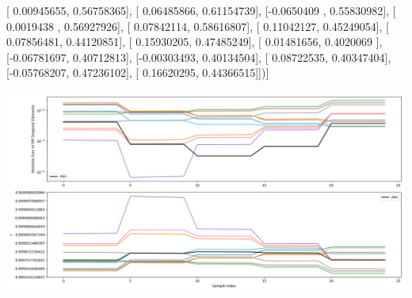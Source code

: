 \documentclass{article}
\begin{document}
       [ 0.00945655,  0.56758365],
       [ 0.06485866,  0.61154739],
       [-0.0650409 ,  0.55830982],
       [ 0.0019438 ,  0.56927926],
       [ 0.07842114,  0.58616807],
       [ 0.11042127,  0.45249054],
       [ 0.07856481,  0.44120851],
       [ 0.15930205,  0.47485249],
       [ 0.01481656,  0.4020069 ],
       [-0.06781697,  0.40712813],
       [-0.00303493,  0.40134504],
       [ 0.08722535,  0.40347404],
       [-0.05768207,  0.47236102],
       [ 0.16620295,  0.44366515]])]
\begin{center}
\includegraphics[scale=.9]{report_pickled_controls187/control_dpn_all.png}

\end{center}
\end{document}
